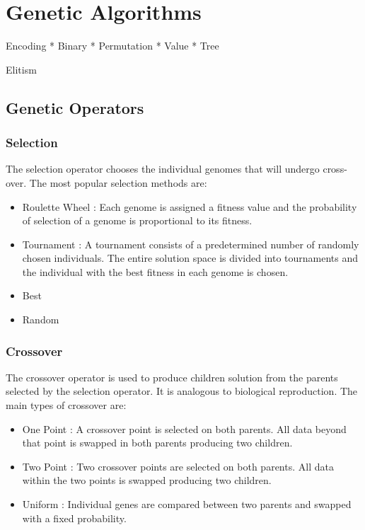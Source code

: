 %
%
%
\chapter{Genetic Algorithms}\label{ch:ga}
Encoding
* Binary
* Permutation
* Value
* Tree

Elitism
\section{Genetic Operators} \label{sec:operators}

\subsection{Selection}
The selection operator chooses the individual genomes that will undergo cross-over. The most popular selection methods are:
\begin{itemize}
\item Roulette Wheel : Each genome is assigned a fitness value and the probability of selection of a genome is proportional to its fitness. 
\item Tournament : A tournament consists of a predetermined number of randomly chosen individuals. The entire solution space is divided into tournaments and the individual with the best fitness in each genome is chosen.
\item Best
\item Random
\end{itemize}

\subsection{Crossover}
 The crossover operator is used to produce children solution from the parents selected by the selection operator. It is analogous to biological reproduction. The main types of crossover are: 
\begin{itemize}
\item One Point : A crossover point is selected on both parents. All data beyond that point is swapped in both parents producing two children. 
\item Two Point : Two crossover points are selected on both parents. All data within the two points is swapped producing two children.
\item Uniform : Individual genes are compared between two parents and swapped with a fixed probability. 
\end{itemize}


